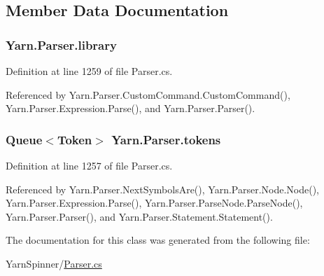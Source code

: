 \subsection{Member Data Documentation}
\hypertarget{a00139_a1313951b09177a1c83b6cf035139197a}{
\subsubsection[{library}]{ Yarn.\-Parser.\-library\hspace{0.3cm}{\ttfamily [private]}}}\label{a00139_a1313951b09177a1c83b6cf035139197a}


Definition at line 1259 of file Parser.\-cs.



Referenced by Yarn.\-Parser.\-Custom\-Command.\-Custom\-Command(), Yarn.\-Parser.\-Expression.\-Parse(), and Yarn.\-Parser.\-Parser().

\hypertarget{a00139_a1a4de646937057988b59d2ff8035eae3}{
\subsubsection[{tokens}]{\setlength{\rightskip}{0pt plus 5cm}Queue$<${\bf Token}$>$ Yarn.\-Parser.\-tokens\hspace{0.3cm}{\ttfamily [private]}}}\label{a00139_a1a4de646937057988b59d2ff8035eae3}


Definition at line 1257 of file Parser.\-cs.



Referenced by Yarn.\-Parser.\-Next\-Symbols\-Are(), Yarn.\-Parser.\-Node.\-Node(), Yarn.\-Parser.\-Expression.\-Parse(), Yarn.\-Parser.\-Parse\-Node.\-Parse\-Node(), Yarn.\-Parser.\-Parser(), and Yarn.\-Parser.\-Statement.\-Statement().



The documentation for this class was generated from the following file\-:\begin{DoxyCompactItemize}
\item 
Yarn\-Spinner/\hyperlink{a00295}{Parser.\-cs}\end{DoxyCompactItemize}
